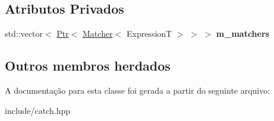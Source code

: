 \subsection*{Atributos Privados}
\begin{DoxyCompactItemize}
\item 
std\+::vector$<$ \hyperlink{classCatch_1_1Ptr}{Ptr}$<$ \hyperlink{structCatch_1_1Matchers_1_1Impl_1_1Matcher}{Matcher}$<$ ExpressionT $>$ $>$ $>$ {\bfseries m\+\_\+matchers}\hypertarget{classCatch_1_1Matchers_1_1Impl_1_1Generic_1_1AllOf_ae10db1f4c8fc3c6fd3a4e32478e1bf19}{}\label{classCatch_1_1Matchers_1_1Impl_1_1Generic_1_1AllOf_ae10db1f4c8fc3c6fd3a4e32478e1bf19}

\end{DoxyCompactItemize}
\subsection*{Outros membros herdados}


A documentação para esta classe foi gerada a partir do seguinte arquivo\+:\begin{DoxyCompactItemize}
\item 
include/catch.\+hpp\end{DoxyCompactItemize}
